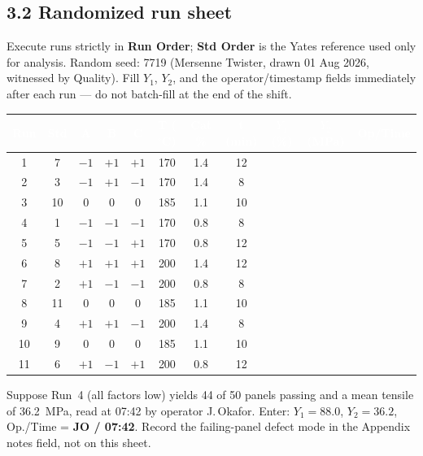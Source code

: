 \subsection*{3.2 Randomized run sheet}
Execute runs strictly in \textbf{Run Order}; \textbf{Std Order} is the Yates reference used
only for analysis. Random seed: 7719 (Mersenne Twister, drawn 01 Aug 2026, witnessed by Quality).
Fill \(Y_1\), \(Y_2\), and the operator/timestamp fields immediately after each run --- do not
batch-fill at the end of the shift.

\vspace{0.3em}
\begin{center}
\renewcommand{\arraystretch}{1.15}
\scriptsize
\setlength{\tabcolsep}{3.6pt}
\begin{tabular}{@{}c c c c c c c c c c c@{}}
\toprule
\rowcolor{doeprimary}
\textcolor{white}{\textbf{Run}} & \textcolor{white}{\textbf{Std}} &
\textcolor{white}{\textbf{A}} & \textcolor{white}{\textbf{B}} & \textcolor{white}{\textbf{C}} &
\textcolor{white}{\textbf{T (\(^\circ\)C)}} & \textcolor{white}{\textbf{Cat \%}} &
\textcolor{white}{\textbf{t (min)}} & \textcolor{white}{\textbf{\(Y_1\) (\%)}} &
\textcolor{white}{\textbf{\(Y_2\) (MPa)}} & \textcolor{white}{\textbf{Op/Time}} \\
\midrule
1  & 7  & \(-1\) & \(+1\) & \(+1\) & 170 & 1.4 & 12 & & & \\
2  & 3  & \(-1\) & \(+1\) & \(-1\) & 170 & 1.4 & 8  & & & \\
3  & 10 & \(0\)  & \(0\)  & \(0\)  & 185 & 1.1 & 10 & & & \\
4  & 1  & \(-1\) & \(-1\) & \(-1\) & 170 & 0.8 & 8  & & & \\
5  & 5  & \(-1\) & \(-1\) & \(+1\) & 170 & 0.8 & 12 & & & \\
6  & 8  & \(+1\) & \(+1\) & \(+1\) & 200 & 1.4 & 12 & & & \\
7  & 2  & \(+1\) & \(-1\) & \(-1\) & 200 & 0.8 & 8  & & & \\
8  & 11 & \(0\)  & \(0\)  & \(0\)  & 185 & 1.1 & 10 & & & \\
9  & 4  & \(+1\) & \(+1\) & \(-1\) & 200 & 1.4 & 8  & & & \\
10 & 9  & \(0\)  & \(0\)  & \(0\)  & 185 & 1.1 & 10 & & & \\
11 & 6  & \(+1\) & \(-1\) & \(+1\) & 200 & 0.8 & 12 & & & \\
\bottomrule
\end{tabular}
\end{center}

\begin{notebox}
Suppose Run~4 (all factors low) yields 44 of 50 panels passing and a mean tensile of
36.2~MPa, read at 07{:}42 by operator J.\,Okafor. Enter: \(Y_1 = \mathbf{88.0}\),
\(Y_2 = \mathbf{36.2}\), Op./Time = \textbf{JO / 07:42}. Record the failing-panel defect
mode in the Appendix notes field, not on this sheet.
\end{notebox}
